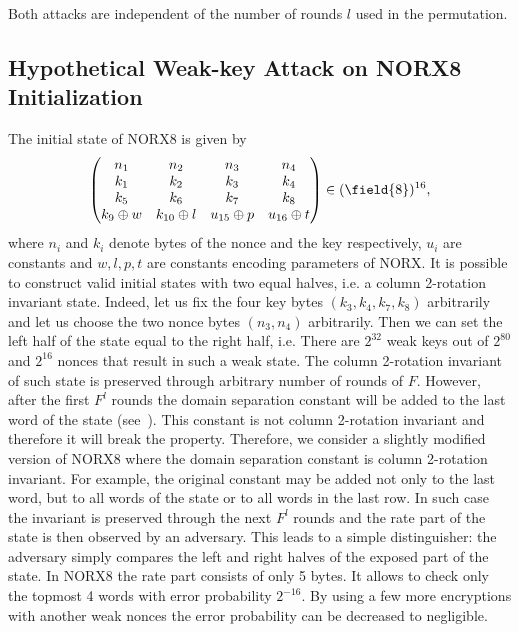 Both attacks are independent of the number of rounds $l$ used in the permutation.

\subsection{Hypothetical Weak-key Attack on NORX8 Initialization}
The initial state of NORX8 is given by
\begin{equation}
\begin{pmatrix}
    n_1 & n_2 & n_3 & n_4 \\
    k_1 & k_2 & k_3 & k_4 \\
    k_5 & k_6 & k_7 & k_8 \\
    k_9\oplus w & k_{10}\oplus l & u_{15}\oplus p  & u_{16}\oplus t \\
\end{pmatrix} \in (\field{8})^{16},
\end{equation}
where $n_i$ and $k_i$ denote bytes of the nonce and the key respectively, $u_i$ are constants and $w,l,p,t$ are constants encoding parameters of NORX. It is possible to construct valid initial states with two equal halves, i.e. a column 2-rotation invariant state. Indeed, let us fix the four key bytes $(k_3, k_4, k_7, k_8)$ arbitrarily and let us choose the two nonce bytes $(n_3, n_4)$ arbitrarily. Then we can set the left half of the state equal to the right half, i.e.
There are $2^{32}$ weak keys out of $2^{80}$ and $2^{16}$ nonces that result in such a weak state. The column 2-rotation invariant of such state is preserved through arbitrary number of rounds of $F$. However, after the first $F^l$ rounds the domain separation constant will be added to the last word of the state (see~). This constant is not column 2-rotation invariant and therefore it will break the property. Therefore, we consider a slightly modified version of NORX8 where the domain separation constant is column 2-rotation invariant. For example, the original constant may be added not only to the last word, but to all words of the state or to all words in the last row. In such case the invariant is preserved through the next $F^l$ rounds and the rate part of the state is then observed by an adversary. This leads to a simple distinguisher: the adversary simply compares the left and right halves of the exposed part of the state. In NORX8 the rate part consists of only 5 bytes. It allows to check only the topmost 4 words with error probability $2^{-16}$. By using a few more encryptions with another weak nonces the error probability can be decreased to negligible.

